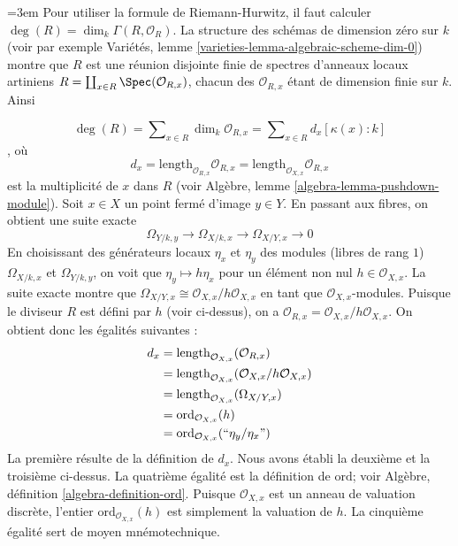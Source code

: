 \medskip\noindent
{\emergencystretch=3em
Pour utiliser la formule de Riemann-Hurwitz, il faut calculer $\deg(R) = \dim_k \Gamma(R, \mathcal{O}_R)$. La structure des schémas de dimension zéro sur $k$ (voir par exemple Variétés, lemme \ref{varieties-lemma-algebraic-scheme-dim-0}) montre que $R$ est une réunion disjointe finie de spectres d'anneaux locaux artiniens $R = \coprod_{x \in R} \Spec(\mathcal{O}_{R, x})$, chacun des $\mathcal{O}_{R, x}$ étant de dimension finie sur $k$. Ainsi
\par}
$$
\deg(R) = \sum\nolimits_{x \in R} \dim_k \mathcal{O}_{R, x} =
\sum\nolimits_{x \in R} d_x [\kappa(x) : k]
$$, où $$
d_x = \text{length}_{\mathcal{O}_{R, x}} \mathcal{O}_{R, x} =
\text{length}_{\mathcal{O}_{X, x}} \mathcal{O}_{R, x}
$$ est la multiplicité de $x$ dans $R$ (voir Algèbre, lemme \ref{algebra-lemma-pushdown-module}). Soit $x \in X$ un point fermé d'image $y \in Y$. En passant aux fibres, on obtient une suite exacte $$
\Omega_{Y/k, y} \to \Omega_{X/k, x} \to \Omega_{X/Y, x} \to 0
$$ En choisissant des générateurs locaux $\eta_x$ et $\eta_y$ des modules (libres de rang $1$) $\Omega_{X/k, x}$ et $\Omega_{Y/k, y}$, on voit que $
\eta_y \mapsto h \eta_x
$ pour un élément non nul $h \in \mathcal{O}_{X, x}$. La suite exacte montre que $\Omega_{X/Y, x} \cong \mathcal{O}_{X, x}/h\mathcal{O}_{X, x}$ en tant que $\mathcal{O}_{X, x}$-modules. Puisque le diviseur $R$ est défini par $h$ (voir ci-dessus), on a $\mathcal{O}_{R, x} = \mathcal{O}_{X, x}/h\mathcal{O}_{X, x}$. On obtient donc les égalités suivantes : \begin{align*}
d_x
& =
\text{length}_{\mathcal{O}_{X, x}}(\mathcal{O}_{R, x}) \\
& =
\text{length}_{\mathcal{O}_{X, x}}(\mathcal{O}_{X, x}/h\mathcal{O}_{X, x}) \\
& =
\text{length}_{\mathcal{O}_{X, x}}(\Omega_{X/Y, x}) \\
& =
\text{ord}_{\mathcal{O}_{X, x}}(h) \\
& =
\text{ord}_{\mathcal{O}_{X, x}}(``\eta_y/\eta_x")
\end{align*} La première résulte de la définition de $d_x$. Nous avons établi la deuxième et la troisième ci-dessus. La quatrième égalité est la définition de $\text{ord}$; voir Algèbre, définition \ref{algebra-definition-ord}. Puisque $\mathcal{O}_{X, x}$ est un anneau de valuation discrète, l'entier $\text{ord}_{\mathcal{O}_{X, x}}(h)$ est simplement la valuation de $h$. La cinquième égalité sert de moyen mnémotechnique.

